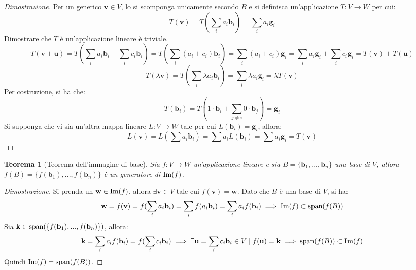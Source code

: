 \documentclass{article}
\newtheorem{theorem}{Teorema}
\begin{document}
    \begin{proof}[Dimostrazione]
        Per un generico $\mathbf{v} \in V$, lo si scomponga unicamente secondo $B$ e si definisca un'applicazione $T: V \rightarrow W$ per cui:
        \[
            T(\mathbf{v}) = T(\sum_{i} a_i \mathbf{b}_{i}) = \sum_{i} a_i \mathbf{g}_{i}
        \]
        Dimostrare che $T$ è un'applicazione lineare è triviale. 
        \[
            T(\mathbf{v} + \mathbf{u}) = T(\sum_{i} a_i \mathbf{b}_{i} + \sum_{i} c_i \mathbf{b}_{i}) = T(\sum_{i} (a_i + c_i) \mathbf{b}_{i}) = \sum_{i} (a_i + c_i) \mathbf{g}_{i} = \sum_{i} a_i \mathbf{g}_{i} + \sum_{i} c_i \mathbf{g}_{i} = T(\mathbf{v}) + T(\mathbf{u})
        \]
        \[
            T(\lambda \mathbf{v}) = T(\sum_{i} \lambda a_i \mathbf{b}_{i}) = \sum_{i} \lambda a_i \mathbf{g}_{i} = \lambda T(\mathbf{v})
        \]
        Per costruzione, si ha che:
        \[
            T(\mathbf{b}_{i}) = T(1 \cdot \mathbf{b}_{i} + \sum_{j \neq i} 0 \cdot \mathbf{b}_{j}) = \mathbf{g}_{i}
        \]
        Si supponga che vi sia un'altra mappa lineare $L : V \rightarrow W$ tale per cui $L(\mathbf{b}_{i}) = \mathbf{g}_{i}$, allora:
        \[
            L(\mathbf{v}) = L(\sum a_i \mathbf{b}_{i}) = \sum a_i L(\mathbf{b}_{i}) = \sum a_i \mathbf{g}_{i} = T(\mathbf{v})
        \]
    \end{proof}

    \vspace{10pt}
    \begin{theorem}[Teorema dell'immagine di base] \label{thm:image_of_basis}
        Sia $f : V \rightarrow W$ un'applicazione lineare e sia $B = \{\mathbf{b}_{1}, ..., \mathbf{b}_{n}\}$ una base di $V$, allora $f(B) = \{f(\mathbf{b}_{1}), ..., f(\mathbf{b}_{n})\}$ è un generatore di $\textnormal{Im}(f)$.
    \end{theorem}

    \begin{proof}[Dimostrazione]
        Si prenda un $\mathbf{w} \in \textnormal{Im}(f)$, allora $\exists \mathbf{v} \in V$ tale cui $f(\mathbf{v}) = \mathbf{w}$. Dato che $B$ è una base di $V$, si ha:
        \[
            \mathbf{w} = f(\mathbf{v}) = f(\sum_{i} a_i \mathbf{b}_{i}) = \sum_{i} f(a_i \mathbf{b}_{i}) = \sum_{i} a_i f(\mathbf{b}_{i}) \implies \textnormal{Im}(f) \subset \textnormal{span}(f(B))
        \]
        Sia $\mathbf{k} \in \textnormal{span}(\{f(\mathbf{b}_{1}), ..., f(\mathbf{b}_{n})\})$, allora:
        \[
            \mathbf{k} = \sum_{i} c_i f(\mathbf{b}_{i}) = f(\sum_{i} c_i \mathbf{b}_{i}) \implies \exists \mathbf{u} = \sum_{i} c_i \mathbf{b}_{i} \in V \; | \; f(\mathbf{u}) = \mathbf{k} \implies \textnormal{span}(f(B)) \subset \textnormal{Im}(f)
        \]
        Quindi $\textnormal{Im}(f) = \textnormal{span}(f(B))$. 
    \end{proof}
\end{document}
